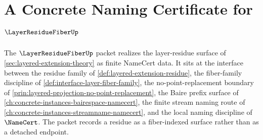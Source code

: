 \chapter{A Concrete Naming Certificate for $\LayerResidueFiberUp$}
\label{ch:concrete-instances-layer-residue-fiber-namecert}

The $\LayerResidueFiberUp$ packet realizes the layer-residue surface of \autoref{sec:layered-extension-theory} as finite NameCert data. It sits at the interface between the residue family of \autoref{def:layered-extension-residue}, the fiber-family discipline of \autoref{def:interface-layer-fiber-family}, the no-point-replacement boundary of \autoref{prin:layered-projection-no-point-replacement}, the Baire prefix surface of \autoref{ch:concrete-instances-bairespace-namecert}, the finite stream naming route of \autoref{ch:concrete-instances-streamname-namecert}, and the local naming discipline of $\NameCert$. The packet records a residue as a fiber-indexed surface rather than as a detached endpoint.

